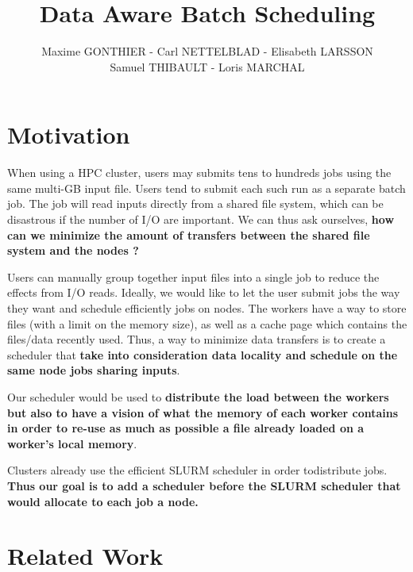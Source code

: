 \documentclass[a4paper]{article}
\title{Data Aware Batch Scheduling}
\author{Maxime GONTHIER - Carl NETTELBLAD - Elisabeth LARSSON \\ Samuel THIBAULT - Loris MARCHAL}
\begin{document}
\maketitle
\tableofcontents
\listoffigures
\newpage


\section{Motivation}

When using a HPC cluster, users may submits tens to hundreds jobs using the same multi-GB input file.
Users tend to submit each such run as a separate batch job.
The job will read inputs directly from a shared file system, which can be disastrous if the number of I/O are important.
We can thus ask ourselves, \textbf{how can we minimize the amount of transfers between the shared file system and the nodes ?}

Users can manually group together input files into a single job to reduce the effects from I/O reads.
Ideally, we would like to let the user submit jobs the way they want and schedule efficiently jobs on nodes.
The workers have a way to store files (with a limit on the memory size), as well as a cache page which contains the files/data recently used.
Thus, a way to minimize data transfers is to create a scheduler that \textbf{take into consideration data locality and schedule on the same node jobs sharing inputs}.

Our scheduler would be used to \textbf{distribute the load between the workers but also to have a vision of what the memory of each worker contains in order to re-use as much as possible a file already loaded on a worker's local memory}.

Clusters already use the efficient SLURM scheduler in order todistribute jobs.
\textbf{Thus our goal is to add a scheduler before the SLURM scheduler that would allocate to each job a node.}

\section{Related Work}
\end{document}
